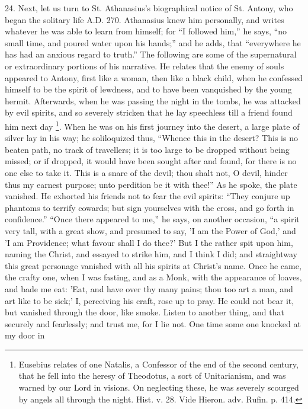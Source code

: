 24.
Next, let us turn to St. Athanasius's biographical notice of St.
Antony, who began the solitary life A.D.
270. Athanasius knew him personally, and writes whatever he was able
to learn from himself; for ``I followed him,'' he says, ``no small time,
and poured water upon his hands;'' and he adds, that ``everywhere he has
had an anxious regard to truth.'' The following are some of the
supernatural or extraordinary portions of his narrative. He relates
that the enemy of souls appeared to Antony, first like a woman, then
like a black child, when he confessed himself to be the spirit of
lewdness, and to have been vanquished by the young hermit. Afterwards,
when he was passing the night in the tombs, he was attacked by evil
spirits, and so severely stricken that he lay speechless till a friend
found him next day \footnote{Eusebius relates of one Natalis, a Confessor
of the end of the second century, that he fell into the heresy of
Theodotus, a sort of Unitarianism, and was warned by our Lord in
visions. On neglecting these, he was severely scourged by angels all
through the night. Hist. v. 28. Vide Hieron. adv. Rufin. p. 414.}. When he was on his first journey
into the desert, a large plate of silver lay in his way; he
soliloquized thus, ``Whence this in the desert? This is no beaten path,
no track of travellers; it is too large to be dropped without being
missed; or if dropped, it would have been sought after and found, for
there is no one else to take it. This is a snare of the devil; thou
shalt not, O devil, hinder thus my earnest purpose; unto perdition be
it with thee!'' As he spoke, the plate vanished. He exhorted his
friends not to fear the evil spirits: ``They conjure up phantoms to
terrify cowards; but sign yourselves with the cross, and go forth in
confidence.'' ``Once there appeared to me,'' he says, on another
occasion, ``a spirit very tall, with a great show, and presumed to say,
'I am the Power of God,' and 'I am Providence; what favour shall I do
thee?' But I the rather spit upon him, naming the Christ, and essayed
to strike him, and I think I did; and straightway this great personage
vanished with all his spirits at Christ's name. Once he came, the
crafty one, when I was fasting, and as a Monk, with the appearance of
loaves, and bade me eat: 'Eat, and have over thy many pains;
thou too art a man, and art like to be sick;' I, perceiving his craft,
rose up to pray. He could not bear it, but vanished through the door,
like smoke. Listen to another thing, and that securely and fearlessly;
and trust me, for I lie not. One time some one knocked at my door in
